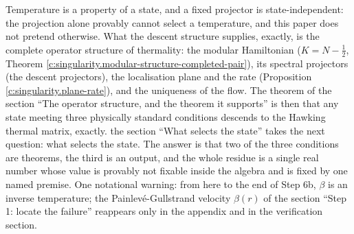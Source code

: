 \documentclass[11pt]{article}
\theoremstyle{definition}
\theoremstyle{plain}
\begin{document}
\label{c:note.singularity.setting-step-4d-compute-completion-thermality}
Temperature is a property of a state, and a fixed projector is state-independent: the projection alone provably cannot select a temperature, and this paper does not pretend otherwise. What the descent structure supplies, exactly, is the complete operator structure of thermality: the modular Hamiltonian ($K = N - \tfrac12$, Theorem \ref{c:singularity.modular-structure-completed-pair}), its spectral projectors (the descent projectors), the localisation plane and the rate (Proposition \ref{c:singularity.plane-rate}), and the uniqueness of the flow. The theorem of the section ``The operator structure, and the theorem it supports'' is then that any state meeting three physically standard conditions descends to the Hawking thermal matrix, exactly. the section ``What selects the state'' takes the next question: what selects the state. The answer is that two of the three conditions are theorems, the third is an output, and the whole residue is a single real number whose value is provably not fixable inside the algebra and is fixed by one named premise. One notational warning: from here to the end of Step 6b, $\beta$ is an inverse temperature; the Painlev\'e-Gullstrand velocity $\beta(r)$ of the section ``Step 1: locate the failure'' reappears only in the appendix and in the verification section.
\end{document}
